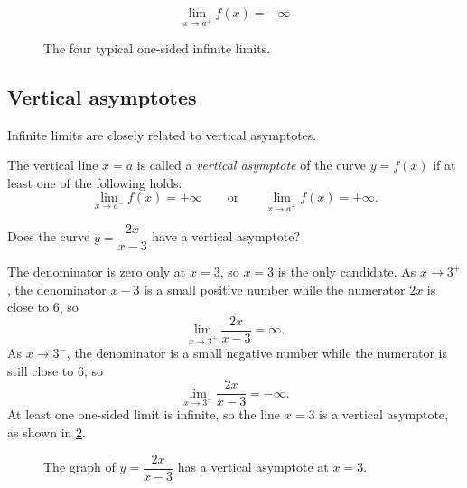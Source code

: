 \begin{figure}[H]
\begin{minipage}{0.23\textwidth}
\vspace{0.3em}
\[
\lim_{x \to a^{+}} f(x) = -\infty
\]
\end{minipage}

\caption{The four typical one-sided infinite limits.}
\label{fig:one-sided-infinite-limits}
\end{figure}

\subsection{Vertical asymptotes}

Infinite limits are closely related to vertical asymptotes.

\begin{definition}
The vertical line \(x = a\) is called a \emph{vertical asymptote} of the curve \(y = f(x)\) if at least one of the following holds:
\[
\lim_{x \to a^{-}} f(x) = \pm\infty \qquad \text{or} \qquad \lim_{x \to a^{+}} f(x) = \pm\infty.
\]
\end{definition}

\begin{workedexample}
\begin{example}
Does the curve \(y = \dfrac{2x}{x - 3}\) have a vertical asymptote?
\end{example}

\begin{solution}
The denominator is zero only at \(x = 3\), so \(x = 3\) is the only candidate. As \(x \to 3^{+}\), the denominator \(x - 3\) is a small positive number while the numerator \(2x\) is close to \(6\), so
\[
\lim_{x \to 3^{+}} \frac{2x}{x - 3} = \infty.
\]
As \(x \to 3^{-}\), the denominator is a small negative number while the numerator is still close to \(6\), so
\[
\lim_{x \to 3^{-}} \frac{2x}{x - 3} = -\infty.
\]
At least one one-sided limit is infinite, so the line \(x = 3\) is a vertical asymptote, as shown in \cref{fig:vertical-asymptote-example}.
\end{solution}
\end{workedexample}

\begin{figure}[H]
\centering
{}
\caption{The graph of \(y = \dfrac{2x}{x - 3}\) has a vertical asymptote at \(x = 3\).}
\label{fig:vertical-asymptote-example}
\end{figure}

